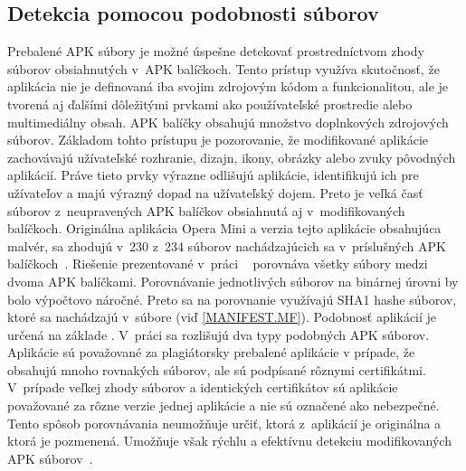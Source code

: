 \subsection{Detekcia pomocou podobnosti súborov}
Prebalené APK súbory je možné úspešne detekovať prostredníctvom zhody súborov obsiahnutých v~APK balíčkoch. Tento prístup využíva skutočnosť, že aplikácia nie je definovaná iba svojim zdrojovým kódom a funkcionalitou, ale je tvorená aj ďalšími dôležitými prvkami ako používateľské prostredie alebo multimediálny obsah. APK balíčky obsahujú množstvo doplnkových zdrojových súborov.  Základom tohto prístupu je pozorovanie, že modifikované aplikácie zachovávajú užívateľské rozhranie, dizajn, ikony, obrázky alebo zvuky pôvodných aplikácií. Práve tieto prvky výrazne odlišujú aplikácie, identifikujú ich pre užívateľov a majú výrazný dopad na užívateľský dojem. Preto je veľká časť súborov z~neupravených APK balíčkov obsiahnutá aj v~modifikovaných balíčkoch. Originálna aplikácia Opera Mini a verzia tejto aplikácie obsahujúca malvér, sa zhodujú v~230 z~234 súborov nachádzajúcich sa v~príslušných APK balíčkoch~\cite{Zhauniarovich2014}. Riešenie prezentované v~práci ~\cite{Zhauniarovich2014} porovnáva všetky súbory medzi dvoma APK balíčkami.  Porovnávanie jednotlivých súborov na binárnej úrovni by bolo výpočtovo náročné. Preto sa na porovnanie využívajú SHA1 hashe súborov, ktoré sa nachádzajú v~súbore  (viď \ref{MANIFEST.MF}). Podobnosť aplikácií je určená na základe . V~práci sa rozlišujú dva typy podobných APK súborov. Aplikácie sú považované za plagiátorsky prebalené aplikácie v prípade, že obsahujú mnoho rovnakých súborov, ale sú podpísané rôznymi certifikátmi. V~prípade veľkej zhody súborov a  identických certifikátov sú aplikácie považované za rôzne verzie jednej aplikácie a nie sú označené ako nebezpečné. Tento spôsob porovnávania neumožňuje určiť, ktorá z~aplikácií je originálna a ktorá je pozmenená. Umožňuje však rýchlu a efektívnu detekciu modifikovaných APK súborov~\cite{Zhauniarovich2014}. 

